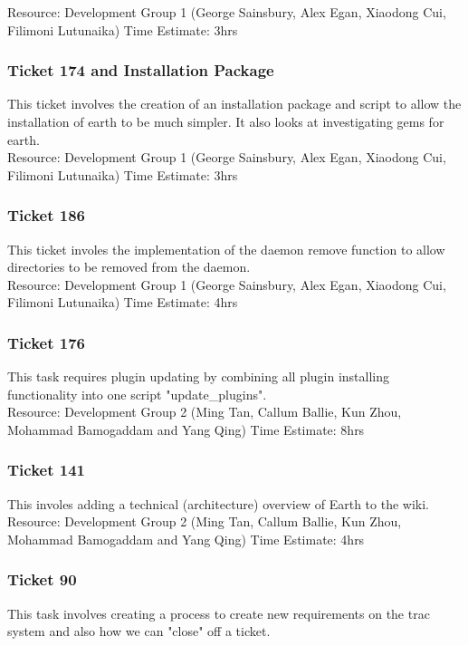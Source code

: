 \documentclass{article}
\begin{document}
	Resource: Development Group 1 (George Sainsbury, Alex Egan, Xiaodong Cui, Filimoni Lutunaika)
	Time Estimate: 3hrs

\subsubsection{Ticket 174 and Installation Package}
	This ticket involves the creation of an installation package and script to allow the installation of earth to be much simpler. It also looks at investigating gems for earth.\\

	Resource: Development Group 1 (George Sainsbury, Alex Egan, Xiaodong Cui, Filimoni Lutunaika)
	Time Estimate: 3hrs
	
\subsubsection{Ticket 186}
	This ticket involes the implementation of the daemon remove function to allow directories to be removed from the daemon.\\

	Resource: Development Group 1 (George Sainsbury, Alex Egan, Xiaodong Cui, Filimoni Lutunaika)
	Time Estimate: 4hrs
	
\subsubsection{Ticket 176}
	This task requires plugin updating by combining all plugin installing functionality into one script "update_plugins".\\

	Resource: Development Group 2 (Ming Tan, Callum Ballie, Kun Zhou, Mohammad Bamogaddam and Yang Qing)
	Time Estimate: 8hrs

\subsubsection{Ticket 141}
	This involes adding a technical (architecture) overview of Earth to the wiki.\\

	Resource: Development Group 2 (Ming Tan, Callum Ballie, Kun Zhou, Mohammad Bamogaddam and Yang Qing)
	Time Estimate: 4hrs
	
\subsubsection{Ticket 90}
	This task involves creating a process to create new requirements on the trac system and also how we can "close" off a ticket.\\
	
\end{document}
